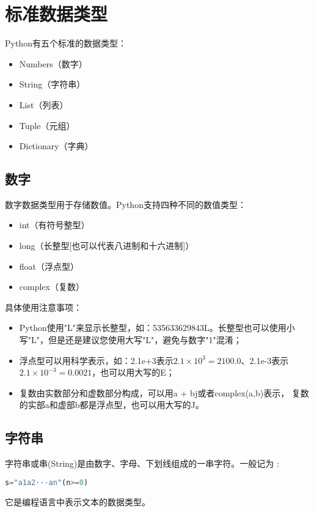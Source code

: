 \section{标准数据类型}
Python有五个标准的数据类型：
\begin{itemize}
\item Numbers（数字）
\item String（字符串）
\item List（列表）
\item Tuple（元组）
\item Dictionary（字典）
\end{itemize}


\subsection{数字}
数字数据类型用于存储数值。Python支持四种不同的数值类型：
\begin{itemize}
\item int（有符号整型）
\item long（长整型[也可以代表八进制和十六进制]）
\item float（浮点型）
\item complex（复数）
\end{itemize}

具体使用注意事项：
\begin{itemize}
\item Python使用"L"来显示长整型，如：535633629843L。长整型也可以使用小写"L"，但是还是建议您使用大写"L"，避免与数字"1"混淆；

\item 浮点型可以用科学表示，如：2.1e+3表示$2.1\times 10^3=2100.0$、2.1e-3表示$2.1\times 10^{-3}=0.0021$，也可以用大写的E；

\item 复数由实数部分和虚数部分构成，可以用a + bj或者complex(a,b)表示， 复数的实部a和虚部b都是浮点型，也可以用大写的J。
\end{itemize}


\subsection{字符串}
字符串或串(String)是由数字、字母、下划线组成的一串字符。一般记为 :
\begin{lstlisting}[language=Python]
s="a1a2···an"(n>=0)
\end{lstlisting}
它是编程语言中表示文本的数据类型。

